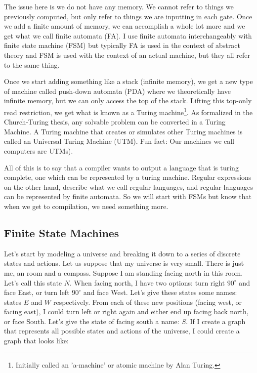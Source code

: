 \documentclass[main.tex]{subfiles}
\begin{document}
The issue here is we do not have any memory. We cannot refer to things we previously computed, but only refer to things we are inputting in each gate. Once we add a finite amount of memory, we can accomplish a whole lot more and we get what we call finite automata (FA). I use finite automata interchangeably with finite state machine (FSM) but typically FA is used in the context of abstract theory and FSM is used with the context of an actual machine, but they all refer to the same thing. 

Once we start adding something like a stack (infinite memory), we get a new type of machine called push-down automata (PDA) where we theoretically have infinite memory, but we can only access the top of the stack. Lifting this top-only read restriction, we get what is known as a Turing machine\footnote{Initially called an 'a-machine' or atomic machine by Alan Turing.}. As formalized in the Church-Turing thesis, any solvable problem can be converted in a Turing Machine. A Turing machine that creates or simulates other Turing machines is called an Universal Turing Machine (UTM). Fun fact: Our machines we call computers are UTMs). 

All of this is to say that a compiler wants to output a language that is turing complete, one which can be represented by a turing machine. Regular expressions on the other hand, describe what we call regular languages, and regular languages can be represented by finite automata. So we will start with FSMs but know that when we get to compilation, we need something more.

\subsection{Finite State Machines}

Let's start by modeling a universe and breaking it down to a series of discrete states and actions.
Let us suppose that my universe is very small. There is just me, an room and a compass. Suppose I am standing facing north in this room. Let's call this state $N$. When facing north, I have two options: turn right $90^{\circ}$ and face East, or turn left $90^{\circ}$ and face West. Let's give these states some names: states $E$ and $W$ respectively. From each of these new positions (facing west, or facing east), I could turn left or right again and either end up facing back north, or face South. Let's give the state of facing south a name: $S$. If I create a graph that represents all possible states and actions of the universe, I could create a graph that looks like:
\end{document}
